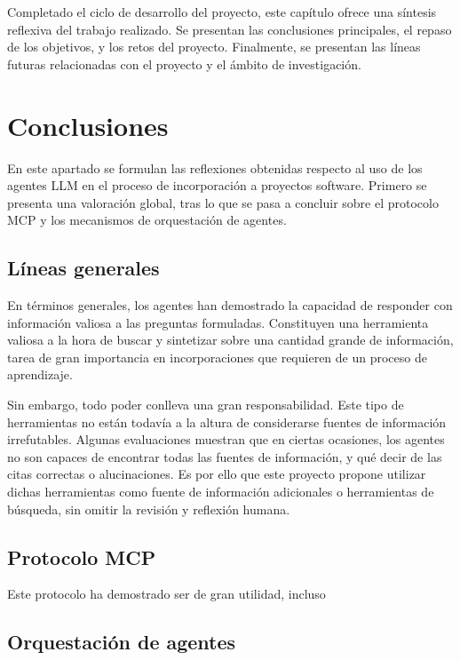 Completado el ciclo de desarrollo del proyecto, este capítulo ofrece una síntesis reflexiva del trabajo realizado. Se presentan las conclusiones principales, el repaso de los objetivos, y los retos del proyecto. Finalmente, se presentan las líneas futuras relacionadas con el proyecto y el ámbito de investigación.

\section{Conclusiones}
En este apartado se formulan las reflexiones obtenidas respecto al uso de los agentes LLM en el proceso de incorporación a proyectos software. Primero se presenta una valoración global, tras lo que se pasa a concluir sobre el protocolo MCP y los mecanismos de orquestación de agentes. 

\subsection{Líneas generales}
En términos generales, los agentes han demostrado la capacidad de responder con información valiosa a las preguntas formuladas. Constituyen una herramienta valiosa a la hora de buscar y sintetizar sobre una cantidad grande de información, tarea de gran importancia en incorporaciones que requieren de un proceso de aprendizaje. 

Sin embargo, todo poder conlleva una gran responsabilidad. Este tipo de herramientas no están todavía a la altura de considerarse fuentes de información irrefutables. Algunas evaluaciones muestran que en ciertas ocasiones, los agentes no son capaces de encontrar todas las fuentes de información, y qué decir de las citas correctas o alucinaciones. Es por ello que este proyecto propone utilizar dichas herramientas como fuente de información adicionales o herramientas de búsqueda, sin omitir la revisión y reflexión humana.

\subsection{Protocolo MCP}
Este protocolo ha demostrado ser de gran utilidad, incluso 


\subsection{Orquestación de agentes}




\subsection{}

